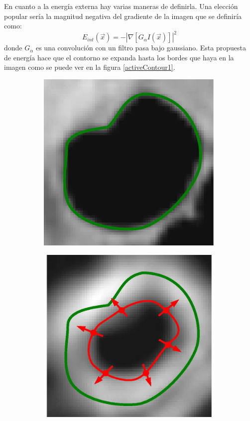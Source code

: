 En cuanto a la energ\'{i}a externa hay varias maneras de definirla. Una elecci\'{o}n popular ser\'{i}a la magnitud negativa del gradiente de la imagen que se definir\'{i}a como:
\begin{equation}
E_{int}(\vec{x}) = - |\nabla [G_{\alpha} I(\vec{x})]|^2
\end{equation}
donde $G_{\alpha}$ es una convoluci\'{o}n con un filtro pasa bajo gaussiano. Esta propuesta de energ\'{i}a hace que el contorno se expanda hasta los bordes que haya en la imagen como se puede ver en la figura \ref{activeContour1}.
\begin{figure}[H]
	\captionsetup{justification=centering}
	\centering
	\begin{subfigure}[t]{2.5in}
		\centering
		\includegraphics[width=.9\textwidth]{./imagenes/activeContour1-1}
		\subcaption{}\label{activeContour1.1}
	\end{subfigure}
	\begin{subfigure}[t]{2.5in}
		\centering
		\includegraphics[width=.9\textwidth]{./imagenes/activeContour1-2}

\end{subfigure}
\end{figure}
